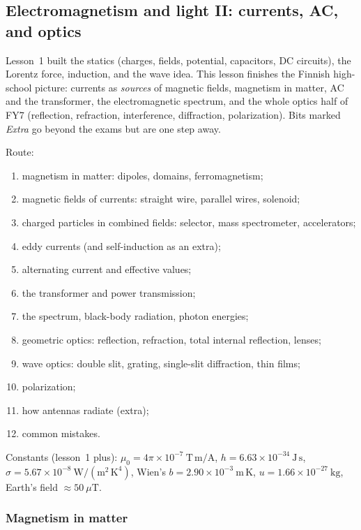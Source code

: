 
\subsection{Electromagnetism and light II: currents, AC, and optics}

Lesson~1 built the statics (charges, fields, potential, capacitors, DC circuits), the Lorentz force, induction, and the wave idea. This lesson finishes the Finnish high-school picture: currents as \emph{sources} of magnetic fields, magnetism in matter, AC and the transformer, the electromagnetic spectrum, and the whole optics half of FY7 (reflection, refraction, interference, diffraction, polarization). Bits marked \emph{Extra} go beyond the exams but are one step away.

Route:
\begin{enumerate}[label=\arabic*.]
  \item magnetism in matter: dipoles, domains, ferromagnetism;
  \item magnetic fields of currents: straight wire, parallel wires, solenoid;
  \item charged particles in combined fields: selector, mass spectrometer, accelerators;
  \item eddy currents (and self-induction as an extra);
  \item alternating current and effective values;
  \item the transformer and power transmission;
  \item the spectrum, black-body radiation, photon energies;
  \item geometric optics: reflection, refraction, total internal reflection, lenses;
  \item wave optics: double slit, grating, single-slit diffraction, thin films;
  \item polarization;
  \item how antennas radiate (extra);
  \item common mistakes.
\end{enumerate}

Constants (lesson~1 plus): $\mu_0 = 4\pi\times 10^{-7}\ \mathrm{T\,m/A}$,
$h = 6.63\times 10^{-34}\ \mathrm{J\,s}$,
$\sigma = 5.67\times 10^{-8}\ \mathrm{W/(m^2\,K^4)}$,
Wien's $b = 2.90\times 10^{-3}\ \mathrm{m\,K}$,
$u = 1.66\times 10^{-27}\ \mathrm{kg}$,
Earth's field $\approx 50\ \mu\mathrm{T}$.

\subsubsection{Magnetism in matter}

